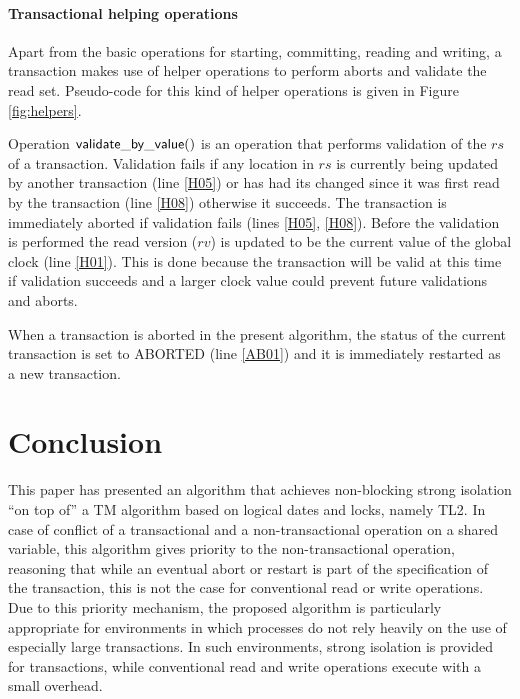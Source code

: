 \documentclass[11pt,letterpaper]{article}
\begin{document}
\paragraph{Transactional helping operations} 
Apart from the basic operations for starting, committing, 
reading and writing, a transaction makes use of helper 
operations to perform aborts and validate the read set.
 Pseudo-code for this kind of helper operations 
is given in Figure \ref{fig:helpers}.

Operation ${\sf validate\_by\_value()}$ is an operation that performs 
validation of the $\mathit{rs}$ of a transaction. 
Validation fails 
if any location in $\mathit{rs}$ is 
currently being updated by another transaction (line \ref{H05})
or has had its changed since it was first read by the transaction (line \ref{H08})
otherwise it succeeds.
The transaction is immediately aborted if validation fails (lines \ref{H05}, \ref{H08}).
Before the validation is performed the read version ($\mathit{rv}$) is updated
to be the current value of the global clock (line \ref{H01}).
This is done because the transaction will be valid at this time
if validation succeeds and a larger
clock value could prevent future validations and aborts.

When a transaction is aborted in the present algorithm, 
the status of the current transaction is set to ABORTED (line \ref{AB01}) and
it is immediately restarted as a new transaction.



\section{Conclusion}
\label{sec:conclusions}
This paper has presented an algorithm that achieves non-blocking strong 
isolation  ``on top of'' a TM algorithm based on logical dates and locks, 
namely  TL2. 
In case of conflict of a transactional and a non-transactional
operation on a shared variable, this algorithm gives priority to 
the non-transactional operation, 
reasoning that while an eventual abort or restart is part of the 
specification of the transaction,
this is not the case for conventional read or write operations. 
Due to this priority mechanism, 
the proposed algorithm is   particularly appropriate  for environments 
in which processes do not rely heavily
on the use of especially large transactions.
In such environments, strong isolation is  provided for transactions, 
while conventional read and write operations execute with a small overhead.
\end{document}
